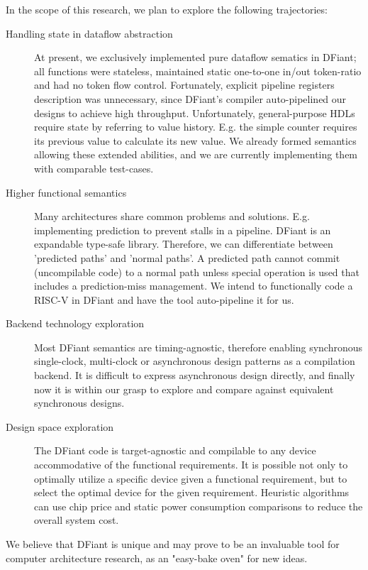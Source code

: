 \documentclass[12pt]{article} %
\begin{document}
In the scope of this research, we plan to explore the following trajectories:

\begin{description}

\item [Handling state in dataflow abstraction]
	At present, we exclusively implemented pure dataflow sematics in DFiant; all functions were stateless, maintained static one-to-one in/out token-ratio and had no token flow control. Fortunately, explicit pipeline registers description was unnecessary, since DFiant's compiler auto-pipelined our designs to achieve high throughput. Unfortunately, general-purpose HDLs require state by referring to value history. E.g. the simple counter requires its previous value to calculate its new value. We already formed semantics allowing these extended abilities, and we are currently implementing them with comparable test-cases. 
	

\item [Higher functional semantics]
	Many architectures share common problems and solutions. E.g. implementing prediction to prevent stalls in a pipeline. DFiant is an expandable type-safe library. Therefore, we can differentiate between 'predicted paths' and 'normal paths'. A predicted path cannot commit (uncompilable code) to a normal path unless special operation is used that includes a prediction-miss management. We intend to functionally code a RISC-V in DFiant and have the tool auto-pipeline it for us.

\item [Backend technology exploration]
  Most DFiant semantics are timing-agnostic, therefore enabling synchronous single-clock, multi-clock or asynchronous design patterns as a compilation backend. It is difficult to express asynchronous design directly, and finally now it is within our grasp to explore and compare against equivalent synchronous designs. 
	
\item [Design space exploration]
	The DFiant code is target-agnostic and compilable to any device accommodative of the functional requirements. It is possible not only to optimally utilize a specific device given a functional requirement, but to select the optimal device for the given requirement. Heuristic algorithms can use chip price and static power consumption comparisons to reduce the overall system cost. \\

\end{description}

We believe that DFiant is unique and may prove to be an invaluable tool for computer architecture research, as an "easy-bake oven" for new ideas. 


{\footnotesize \singlespacing
}
\small


\end{document}
